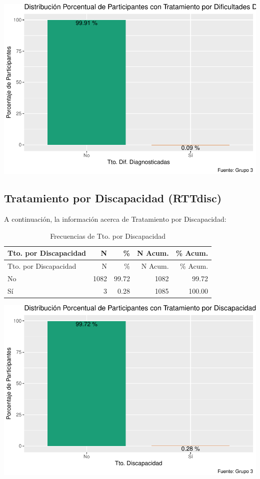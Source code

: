 \documentclass[
]{article}
\begin{document}
\includegraphics{Info_Dinix_02_files/figure-latex/30_RTTdifdiag-1.pdf}

\subsection{Tratamiento por Discapacidad
(RTTdisc)}\label{tratamiento-por-discapacidad-rttdisc}

A continuación, la información acerca de Tratamiento por Discapacidad:

\begin{longtable}[]{@{}lrrrr@{}}
\caption{Frecuencias de Tto. por Discapacidad}\tabularnewline
\toprule\noalign{}
Tto. por Discapacidad & N & \% & N Acum. & \% Acum. \\
\midrule\noalign{}
\endfirsthead
\toprule\noalign{}
Tto. por Discapacidad & N & \% & N Acum. & \% Acum. \\
\midrule\noalign{}
\endhead
\bottomrule\noalign{}
\endlastfoot
No & 1082 & 99.72 & 1082 & 99.72 \\
Sí & 3 & 0.28 & 1085 & 100.00 \\
\end{longtable}

\includegraphics{Info_Dinix_02_files/figure-latex/30_RTTdisc-1.pdf}
\end{document}
